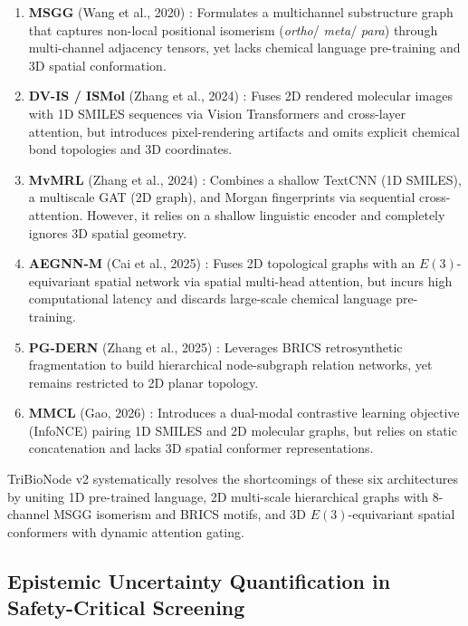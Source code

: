 \documentclass[10pt,twocolumn]{article}
\begin{document}
\begin{enumerate}
    \item \textbf{MSGG} (Wang et al., 2020) \cite{wang2020molecular}: Formulates a multichannel substructure graph that captures non-local positional isomerism (\textit{ortho}/ \textit{meta}/ \textit{para}) through multi-channel adjacency tensors, yet lacks chemical language pre-training and 3D spatial conformation.
    \item \textbf{DV-IS / ISMol} (Zhang et al., 2024) \cite{zhang2024dual}: Fuses 2D rendered molecular images with 1D SMILES sequences via Vision Transformers and cross-layer attention, but introduces pixel-rendering artifacts and omits explicit chemical bond topologies and 3D coordinates.
    \item \textbf{MvMRL} (Zhang et al., 2024) \cite{zhang2024mvmrl}: Combines a shallow TextCNN (1D SMILES), a multiscale GAT (2D graph), and Morgan fingerprints via sequential cross-attention. However, it relies on a shallow linguistic encoder and completely ignores 3D spatial geometry.
    \item \textbf{AEGNN-M} (Cai et al., 2025) \cite{cai2025aegnn}: Fuses 2D topological graphs with an $E(3)$-equivariant spatial network via spatial multi-head attention, but incurs high computational latency and discards large-scale chemical language pre-training.
    \item \textbf{PG-DERN} (Zhang et al., 2025) \cite{zhang2025property}: Leverages BRICS retrosynthetic fragmentation to build hierarchical node-subgraph relation networks, yet remains restricted to 2D planar topology.
    \item \textbf{MMCL} (Gao, 2026) \cite{gao2026mmcl}: Introduces a dual-modal contrastive learning objective (InfoNCE) pairing 1D SMILES and 2D molecular graphs, but relies on static concatenation and lacks 3D spatial conformer representations.
\end{enumerate}

TriBioNode v2 systematically resolves the shortcomings of these six architectures by uniting 1D pre-trained language, 2D multi-scale hierarchical graphs with 8-channel MSGG isomerism and BRICS motifs, and 3D $E(3)$-equivariant spatial conformers with dynamic attention gating.

\subsection{Epistemic Uncertainty Quantification in Safety-Critical Screening}
\end{document}
